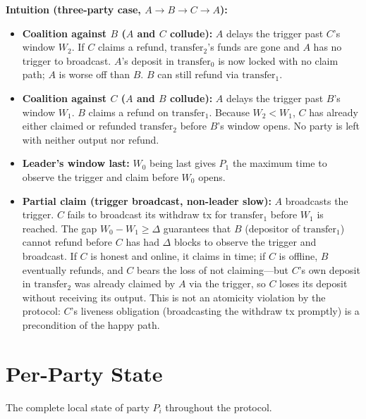 \documentclass[11pt,a4paper,dvipsnames]{article}
\begin{document}
\noindent\textbf{Intuition (three-party case, $A \to B \to C \to A$):}
\begin{itemize}
  \item \textbf{Coalition against $B$ ($A$ and $C$ collude):}\;
    $A$ delays the trigger past $C$'s window $W_2$.
    If $C$ claims a refund, $\mathrm{transfer}_2$'s funds are gone and $A$
    has no trigger to broadcast.
    $A$'s deposit in $\mathrm{transfer}_0$ is now locked with no claim path;
    $A$ is worse off than $B$.
    $B$ can still refund via $\mathrm{transfer}_1$.

  \item \textbf{Coalition against $C$ ($A$ and $B$ collude):}\;
    $A$ delays the trigger past $B$'s window $W_1$.
    $B$ claims a refund on $\mathrm{transfer}_1$.
    Because $W_2 < W_1$, $C$ has already either claimed or refunded
    $\mathrm{transfer}_2$ before $B$'s window opens.
    No party is left with neither output nor refund.

  \item \textbf{Leader's window last:}\;
    $W_0$ being last gives $P_1$ the maximum time to observe the trigger and
    claim before $W_0$ opens.

  \item \textbf{Partial claim (trigger broadcast, non-leader slow):}\;
    $A$ broadcasts the trigger.
    $C$ fails to broadcast its withdraw tx for $\mathrm{transfer}_1$ before
    $W_1$ is reached.
    The gap $W_0 - W_1 \geq \Delta$ guarantees that $B$
    (depositor of $\mathrm{transfer}_1$) cannot refund before $C$ has had
    $\Delta$ blocks to observe the trigger and broadcast.
    If $C$ is honest and online, it claims in time; if $C$ is offline,
    $B$ eventually refunds, and $C$ bears the loss of not claiming---but
    $C$'s own deposit in $\mathrm{transfer}_2$ was already claimed by $A$
    via the trigger, so $C$ loses its deposit without receiving its output.
    This is not an atomicity violation by the protocol: $C$'s liveness
    obligation (broadcasting the withdraw tx promptly) is a precondition
    of the happy path.
\end{itemize}

\section{Per-Party State}

The complete local state of party $P_i$ throughout the protocol.
\end{document}
